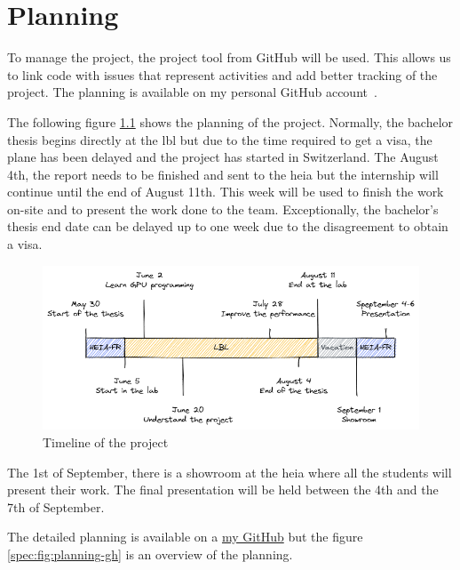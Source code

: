 \chapter{Planning}
\label{spec:ch:planning}

To manage the project, the project tool from GitHub will be used.
This allows us to link code with issues that represent activities and add better tracking of the project.
The planning is available on my personal GitHub account~\cite{github-project}.

The following figure \ref{spec:fig:timeline} shows the planning of the project.
Normally, the bachelor thesis begins directly at the \acrshort{lbl} but due to the time required to get a visa, the plane has been delayed and the project has started in Switzerland.
The August 4th, the report needs to be finished and sent to the \acrshort{heia} but the internship will continue until the end of August 11th.
This week will be used to finish the work on-site and to present the work done to the team.
Exceptionally, the bachelor's thesis end date can be delayed up to one week due to the disagreement to obtain a visa.

\begin{figure}[ht]
    \centering
    \includegraphics[width=\textwidth]{05-resources/img/spec/planning.excalidraw.png}
    \caption{Timeline of the project}
    \label{spec:fig:timeline}
\end{figure}


The 1st of September, there is a showroom at the \acrshort{heia} where all the students will present their work.
The final presentation will be held between the 4th and the 7th of September.

The detailed planning is available on a \href{https://github.com/users/simbarras/projects/3/views/1}{my GitHub} but the figure \ref{spec:fig:planning-gh} is an overview of the planning.

